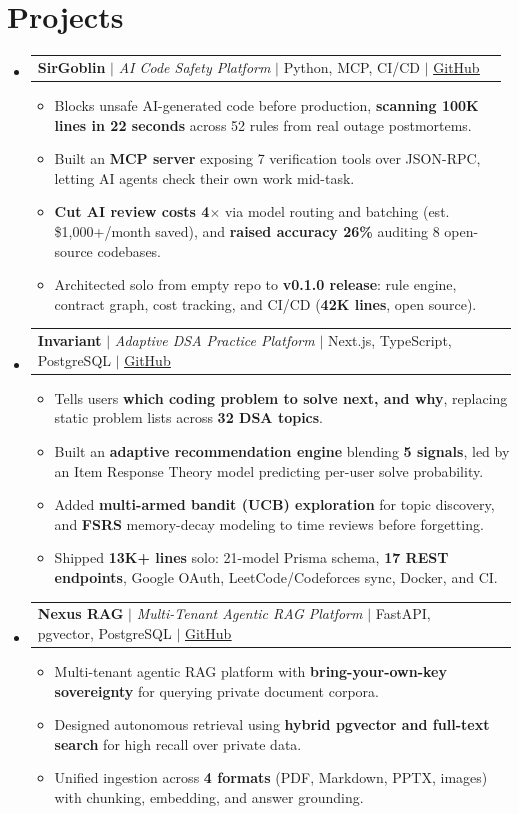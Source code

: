 \documentclass[letterpaper,11pt]{article}
\makeatletter
\newcommand{\resumeItem}[1]{\item{{#1 \vspace{-1pt}}}}
\newcommand{\resumeProjectHeading}[2]{
    \item
    \begin{tabular*}{1.0\textwidth}{l@{\extracolsep{\fill}}r}
      \small#1 & \textbf{\small #2}\\
    \end{tabular*}\vspace{-6pt}
}
\newcommand{\resumeItemListStart}{\begin{itemize}[itemsep=1.5pt, parsep=0pt, topsep=2pt]}
\newcommand{\resumeItemListEnd}{\end{itemize}\vspace{-6pt}}
\newcommand{\resumeSubHeadingListStart}{\begin{itemize}[leftmargin=0.0in, label={}]}
\newcommand{\resumeSubHeadingListEnd}{\end{itemize}}
\makeatother
\begin{document}
\section{Projects}
\resumeSubHeadingListStart
  \resumeProjectHeading
      {\textbf{SirGoblin} $|$ \emph{AI Code Safety Platform} $|$ \small Python, MCP, CI/CD $|$ \href{https://github.com/Pheonix-dev0410/harness}{\underline{GitHub}}}{}
      \resumeItemListStart
        \resumeItem{Blocks unsafe AI-generated code before production, \textbf{scanning 100K lines in 22 seconds} across 52 rules from real outage postmortems.}
        \resumeItem{Built an \textbf{MCP server} exposing 7 verification tools over JSON-RPC, letting AI agents check their own work mid-task.}
        \resumeItem{\textbf{Cut AI review costs 4$\times$} via model routing and batching (est. \$1,000+/month saved), and \textbf{raised accuracy 26\%} auditing 8 open-source codebases.}
        \resumeItem{Architected solo from empty repo to \textbf{v0.1.0 release}: rule engine, contract graph, cost tracking, and CI/CD (\textbf{42K lines}, open source).}
      \resumeItemListEnd\vspace{-2pt}

  \resumeProjectHeading
      {\textbf{Invariant} $|$ \emph{Adaptive DSA Practice Platform} $|$ \small Next.js, TypeScript, PostgreSQL $|$ \href{https://github.com/Pheonix-dev0410/dsa_tracker}{\underline{GitHub}}}{}
      \resumeItemListStart
        \resumeItem{Tells users \textbf{which coding problem to solve next, and why}, replacing static problem lists across \textbf{32 DSA topics}.}
        \resumeItem{Built an \textbf{adaptive recommendation engine} blending \textbf{5 signals}, led by an Item Response Theory model predicting per-user solve probability.}
        \resumeItem{Added \textbf{multi-armed bandit (UCB) exploration} for topic discovery, and \textbf{FSRS} memory-decay modeling to time reviews before forgetting.}
        \resumeItem{Shipped \textbf{13K+ lines} solo: 21-model Prisma schema, \textbf{17 REST endpoints}, Google OAuth, LeetCode/Codeforces sync, Docker, and CI.}
      \resumeItemListEnd\vspace{-2pt}

  \resumeProjectHeading
      {\textbf{Nexus RAG} $|$ \emph{Multi-Tenant Agentic RAG Platform} $|$ \small FastAPI, pgvector, PostgreSQL $|$ \href{https://github.com/dev-0410/nexus-rag}{\underline{GitHub}}}{}
      \resumeItemListStart
        \resumeItem{Multi-tenant agentic RAG platform with \textbf{bring-your-own-key sovereignty} for querying private document corpora.}
        \resumeItem{Designed autonomous retrieval using \textbf{hybrid pgvector and full-text search} for high recall over private data.}
        \resumeItem{Unified ingestion across \textbf{4 formats} (PDF, Markdown, PPTX, images) with chunking, embedding, and answer grounding.}
      \resumeItemListEnd
\resumeSubHeadingListEnd
\end{document}
